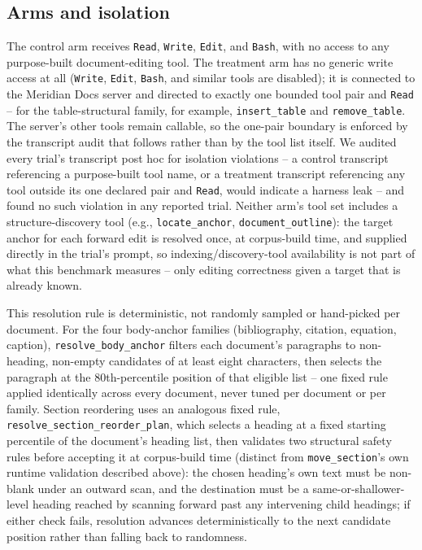 \documentclass[11pt]{article}
\DeclareRobustCommand{\claim}[2]{#2}
\begin{document}
\subsection{Arms and isolation}
\claim{arm-tool-surfaces}{The control arm receives \texttt{Read}, \texttt{Write}, \texttt{Edit}, and \texttt{Bash}, with
no access to any purpose-built document-editing tool. The treatment arm has no generic write
access at all (\texttt{Write}, \texttt{Edit}, \texttt{Bash}, and similar tools are disabled); it is
connected to the Meridian Docs server and directed to exactly one bounded tool pair and
\texttt{Read}} -- \claim{table-tool-pair-vs-manifest}{for the
table-structural family, for example, \texttt{insert\_table} and \texttt{remove\_table}.} The
server's other tools remain callable, so the one-pair boundary is enforced by the transcript
audit that follows rather than by the tool list itself. We
audited every trial's transcript post hoc for isolation
violations -- \claim{arm-tool-surfaces}{a control transcript referencing a purpose-built tool name, or a treatment
transcript referencing any tool outside its one declared pair and \texttt{Read}, would indicate a
harness leak} --
and found no such violation in any reported trial. \claim{anchors-pre-resolved-no-discovery}{\claim{indexing-tools-out-of-scope}{Neither arm's tool set includes a
structure-discovery tool (e.g., \texttt{locate\_anchor}, \texttt{document\_outline}): the target
anchor for each forward edit is resolved once, at corpus-build time, and supplied directly in the
trial's prompt, so indexing/discovery-tool availability is not part of what this benchmark
measures} -- only editing correctness given a target that is already known.}

This resolution rule is deterministic, not randomly sampled or hand-picked per document. For the
four body-anchor families (bibliography, citation, equation, caption),
\texttt{resolve\_body\_anchor} filters each document's paragraphs to non-heading, non-empty
candidates of at least eight characters, then selects the paragraph at the 80th-percentile
position of that eligible list -- one fixed rule applied identically across every document, never
tuned per document or per family. Section reordering uses an analogous fixed rule,
\texttt{resolve\_section\_reorder\_plan}, which selects a heading at a fixed starting percentile of
the document's heading list, \claim{section-reorder-destination-validation}{then validates two structural safety rules before accepting it at
corpus-build time (distinct from
\texttt{move\_section}'s own runtime validation described above): the chosen heading's own text
must be non-blank under an outward scan, and the destination must be a same-or-shallower-level
heading reached by scanning forward past any intervening child headings;} if either check fails,
resolution advances deterministically to the next candidate position rather than falling back to
randomness.
\end{document}

